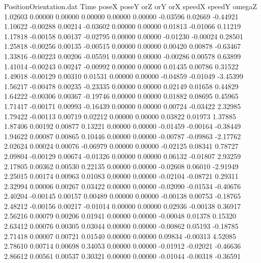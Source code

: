 \begin{filecontents}{PositionOrientation.dat}
Time poseX poseY orZ orY orX speedX speedY omegaZ
   1.02603    0.00000    0.00000     0.00000    0.00000    0.00000   -0.03596    0.02669   -0.44921
   1.10622   -0.00288    0.00214    -0.03602    0.00000    0.00000    0.01813   -0.01066    0.11219
   1.17818   -0.00158    0.00137    -0.02795    0.00000    0.00000   -0.01230   -0.00024    0.28501
   1.25818   -0.00256    0.00135    -0.00515    0.00000    0.00000    0.00420    0.00878   -0.63467
   1.33816   -0.00223    0.00206    -0.05591    0.00000    0.00000   -0.00286    0.00578    0.63899
   1.41014   -0.00243    0.00247    -0.00992    0.00000    0.00000    0.01435    0.00786    0.31522
   1.49018   -0.00129    0.00310     0.01531    0.00000    0.00000   -0.04859   -0.01049   -3.45399
   1.56217   -0.00478    0.00235    -0.23335    0.00000    0.00000    0.02149    0.01658    0.44829
   1.64222   -0.00306    0.00367    -0.19746    0.00000    0.00000    0.01882    0.08695    0.45965
   1.71417   -0.00171    0.00993    -0.16439    0.00000    0.00000    0.00724   -0.03422    2.32985
   1.79422   -0.00113    0.00719     0.02212    0.00000    0.00000    0.03822    0.01973    1.37885
   1.87406    0.00192    0.00877     0.13221    0.00000    0.00000   -0.01459   -0.00164   -0.38449
   1.94622    0.00087    0.00865     0.10446    0.00000    0.00000   -0.00787   -0.09863   -2.17762
   2.02624    0.00024    0.00076    -0.06979    0.00000    0.00000   -0.02125    0.08341    0.78727
   2.09804   -0.00129    0.00674    -0.01326    0.00000    0.00000    0.06132   -0.01807    2.93259
   2.17805    0.00362    0.00530     0.22135    0.00000    0.00000   -0.02608    0.06010   -2.91949
   2.25015    0.00174    0.00963     0.01083    0.00000    0.00000   -0.02104   -0.08721    0.29311
   2.32994    0.00006    0.00267     0.03422    0.00000    0.00000   -0.02090   -0.01534   -0.40676
   2.40204   -0.00145    0.00157     0.00489    0.00000    0.00000   -0.00138    0.00753   -0.18765
   2.48212   -0.00156    0.00217    -0.01014    0.00000    0.00000    0.02936   -0.00138    0.36917
   2.56216    0.00079    0.00206     0.01941    0.00000    0.00000   -0.00048    0.01378    0.15320
   2.63412    0.00076    0.00305     0.03044    0.00000    0.00000   -0.00862    0.05193   -0.18785
   2.71418    0.00007    0.00721     0.01540    0.00000    0.00000    0.09834   -0.00313    4.52085
   2.78610    0.00714    0.00698     0.34053    0.00000    0.00000   -0.01912   -0.02021   -0.46636
   2.86612    0.00561    0.00537     0.30321    0.00000    0.00000   -0.01044   -0.00318   -0.36591

\end{filecontents}
